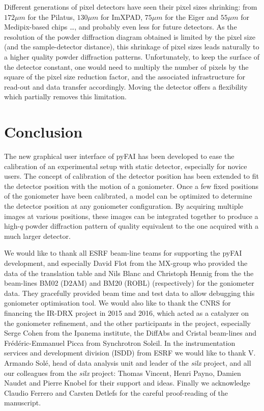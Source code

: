 \documentclass[preprint]{iucr}              %
\begin{document}
Different generations of pixel detectors have seen their pixel sizes
shrinking:
from $172 \mu m$ for the Pilatus, $130 \mu m$ for ImXPAD, $75 \mu m$ for the
Eiger and $55 \mu m$ for Medipix-based chips \ldots, and probably even less for
future detectors.
As the resolution of the powder diffraction diagram obtained is limited by the
pixel size (and the sample-detector distance), this shrinkage of
pixel sizes leads naturally to a higher quality powder
diffraction patterns.
Unfortunately, to keep the surface of the detector constant, one would need
to multiply the number of pixels by the square of the pixel size reduction
factor, and the associated infrastructure for read-out and data transfer
accordingly.
Moving the detector offers a flexibility which partially removes this
limitation.

\section{Conclusion}

The new graphical user interface of pyFAI has been developed to ease the
calibration of an experimental setup with static detector, especially for
novice users.
The concept of calibration of the detector position has been extended to fit
the detector position with the motion of a goniometer.   
Once a few fixed positions of the goniometer have been calibrated, a model can
be optimized to determine the detector position at any goniometer
configuration.
By acquiring multiple images at various positions, these images can be
integrated together to produce a high-$q$ powder diffraction pattern of
quality equivalent to the one acquired with a much larger detector. 
 

We would like to thank all ESRF beam-line teams for supporting the
pyFAI development, and especially David Flot from the MX-group who provided the
data of the translation table and Nils Blanc and Christoph Hennig from the the
beam-lines BM02 (D2AM) and BM20 (ROBL) (respectively) for the goniometer data. 
They gracefully provided beam time and test data to allow debugging this 
goniometer optimisation tool.
We would also like to thank the CNRS for financing the IR-DRX project
in 2015 and 2016, which acted as a catalyzer on the goniometer refinement,
and the other participants in the project, especially Serge Cohen from the
Ipanema institute, the DiffAbs and Cristal beam-lines and Frédéric-Emmanuel Picca 
from Synchrotron Soleil.
In the instrumentation services and development division (ISDD) from ESRF  we
would like to thank V. Armando Solé, head of data analysis unit and leader of 
the \textit{silx} project, and all our colleagues from the \textit{silx}
project:
Thomas Vincent, Henri Payno, Damien Naudet and  Pierre Knobel for their support and ideas. 
Finally we acknowledge Claudio Ferrero and Carsten Detlefs  for the careful
proof-reading of the manuscript. 



\end{document}

